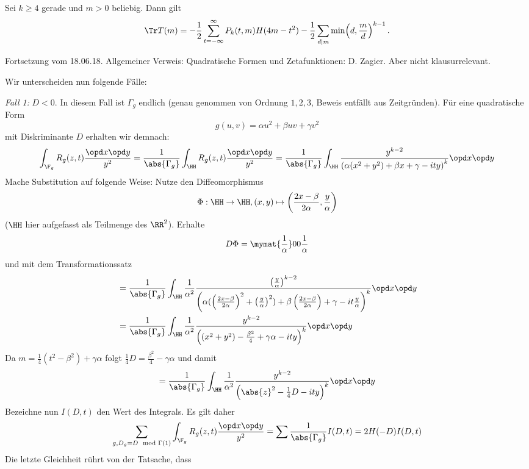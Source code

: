 \begin{theorem}
	Sei $k \geq 4$ gerade und $m > 0$ beliebig. Dann gilt
	\[
		\Tr T(m) = -\frac{1}{2} \sum_{t=-\infty}^\infty P_k(t,m) H(4m-t^2) - \frac{1}{2} \sum_{d|m} \min\Bigl(d, \frac{m}{d}\Bigr)^{k-1}\,.
	\]
\end{theorem}

\begin{bewe}
Fortsetzung vom 18.06.18. Allgemeiner Verweis: Quadratische Formen und Zetafunktionen: D. Zagier. Aber nicht klausurrelevant.

Wir unterscheiden nun folgende Fälle:

\emph{Fall 1:} $D < 0$. In diesem Fall ist $\Gamma_g$ endlich (genau genommen von Ordnung $1, 2, 3$, Beweis entfällt aus Zeitgründen). Für eine quadratische Form
\[
	g(u,v) = \alpha u^2 + \beta uv + \gamma v^2
\]
mit Diskriminante $D$ erhalten wir demnach:
\[
	\int_{\F_g} R_g (z,t) \frac{\opd x \opd y}{y^2} = \frac {1}{\abs{\Gamma_g}} \int_\HH R_g (z,t) \frac{\opd x \opd y}{y^2} = \frac {1}{\abs{\Gamma_g}} \int_\HH \frac{y^{k-2}}{\left( \alpha(x^2 + y^2) + \beta x + \gamma - ity \right)^k} \opd x \opd y
\]
Mache Substitution auf folgende Weise: Nutze den Diffeomorphismus
\[
	\Phi: \HH \to \HH, (x, y) \mapsto \left( \frac {2x-\beta}{2\alpha}, \frac y\alpha \right)
\]
($\HH$ hier aufgefasst als Teilmenge des $\RR^2$). Erhalte
\[
	D\Phi = \mymat {\frac 1\alpha}00{\frac 1\alpha}
\]
und mit dem Transformationssatz
\begin{align*}
	&= \frac {1}{\abs{\Gamma_g}} \int_\HH \frac {1}{\alpha^2} \frac{\left(\frac {y}{\alpha} \right)^{k-2}}{\left( \alpha(\left( \frac {2x-\beta}{2\alpha} \right)^2 + \left( \frac y\alpha \right)^2) + \beta \left( \frac {2x-\beta}{2\alpha} \right) + \gamma - it \frac y\alpha \right)^k} \opd x \opd y \\
	&= \frac {1}{\abs{\Gamma_g}} \int_\HH \frac {1}{\alpha^2} \frac{y^{k-2}}{\left( (x^2 + y^2) - \frac {\beta^2}4 + \gamma \alpha - ity \right)^k} \opd x \opd y
\end{align*}
Da $m = \frac 14 (t^2 - \beta^2) + \gamma\alpha$ folgt $\frac 14 D = \frac {\beta^2}4 - \gamma \alpha$ und damit
\[
	= \frac {1}{\abs{\Gamma_g}} \int_\HH \frac {1}{\alpha^2} \frac{y^{k-2}}{\left( \abs{z}^2 - \frac 14 D - ity \right)^k} \opd x \opd y
\]
Bezeichne nun $I(D, t)$ den Wert des Integrals. Es gilt daher
\[
	\sum_{g, D_g = D \mod \Gamma(1)} \int_{\F_g} R_g(z,t) \frac{\opd x \opd y}{y^2} = \sum \frac{1}{\abs{\Gamma_g}} I(D,t) = 2 H(-D) I(D,t)
\]
Die letzte Gleichheit rührt von der Tatsache, dass

\end{bewe}
